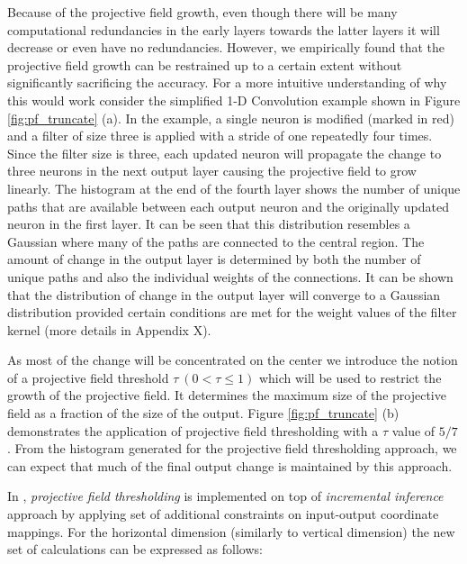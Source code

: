 Because of the projective field growth, even though there will be many computational redundancies in the early layers towards the latter layers it will decrease or even have no redundancies.
However, we empirically found that the projective field growth can be restrained up to a certain extent without significantly sacrificing the accuracy.
For a more intuitive understanding of why this would work consider the simplified 1-D Convolution example shown in Figure \ref{fig:pf_truncate} (a).
In the example, a single neuron is modified (marked in red) and a filter of size three is applied with a stride of one repeatedly four times.
Since the filter size is three, each updated neuron will propagate the change to three neurons in the next output layer causing the projective field to grow linearly.
The histogram at the end of the fourth layer shows the number of unique paths that are available between each output neuron and the originally updated neuron in the first layer.
It can be seen that this distribution resembles a Gaussian where many of the paths are connected to the central region.
The amount of change in the output layer is determined by both the number of unique paths and also the individual weights of the connections.
It can be shown that the distribution of change in the output layer will converge to a Gaussian distribution provided certain conditions are met for the weight values of the filter kernel (more details in Appendix X).

As most of the change will be concentrated on the center we introduce the notion of a projective field threshold $\tau ~ (0 < \tau \leq 1)$ which will be used to restrict the growth of the projective field.
It determines the maximum size of the projective field as a fraction of the size of the output.
Figure \ref{fig:pf_truncate} (b) demonstrates the application of projective field thresholding with a $\tau$ value of $5/7$.
From the histogram generated for the projective field thresholding approach, we can expect that much of the final output change is maintained by this approach.

In \system, \textit{projective field thresholding} is implemented on top of \textit{incremental inference} approach by applying set of additional constraints on input-output coordinate mappings. For the horizontal dimension (similarly to vertical dimension) the new set of calculations can be expressed as follows:

